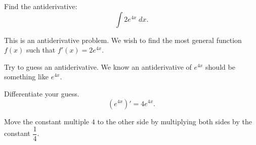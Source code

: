 \documentclass{ximera}
\author{Emma Smith Zbarsky\and Nela Lakos \and Bobby Ramsey}
\begin{document}
\begin{exercise}

Find the antiderivative: \[\int 2e^{4x}\; dx.\]


\begin{hint}
	This is an antiderivative problem. We wish to find the most general
	function $f(x)$ such that $f'(x) = 2e^{4x}$.
\end{hint}

\begin{hint}
	Try to guess an antiderivative.
	We know an antiderivative of $e^{4x}$ should be something like $e^{4x}$.
	
	Differentiate your guess.
	\[(e^{4x})'= 4e^{4x}.\]
\end{hint}

\begin{hint}
	Move the constant multiple $4$ to the other side by multiplying both sides by the constant $\dfrac{1}{4}$.
\end{hint}

\begin{multipleChoice}
\end{multipleChoice}

\end{exercise}
\end{document}
